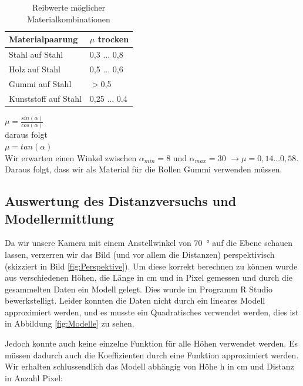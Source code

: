 \documentclass[a4paper]{report}
\begin{document}
\begin{table}[h!]
	\centering
	\begin{tabular}{|p{}|p{}|}
		\hline
		\textbf{Materialpaarung} & \textbf{$\mu$ trocken}\\
		\hline
		Stahl auf Stahl & 0,3 ... 0,8 \\
		\hline
		Holz auf Stahl & 0,5 ... 0,6\\
		\hline
		Gummi auf Stahl & $>$0,5 \\
		\hline
		Kunststoff auf Stahl & 0,25 ... 0.4\\
		\hline
	\end{tabular}
	\caption{Reibwerte möglicher Materialkombinationen \parencite{Wittel2015}}
	\label{tab:Reibwerte}
\end{table}

\noindent
$\mu=\frac{sin(\alpha)}{cos(\alpha)}$\\

\noindent
daraus folgt\\
$\mu=tan(\alpha)$\\
Wir erwarten einen Winkel zwischen $\alpha_{min}=8$ und $\alpha_{max}=30$ $ \rightarrow \mu = 0,14 ... 0,58$. Daraus folgt, dass wir als Material für die Rollen Gummi verwenden müssen.

\subsection{Auswertung des Distanzversuchs und Modellermittlung}
\label{ssec:DistModelCreation}

Da wir unsere Kamera mit einem Anstellwinkel von \SI{70}{\degree} auf die Ebene schauen lassen, verzerren wir das Bild (und vor allem die Distanzen) perspektivisch (skizziert in Bild \ref{fig:Perspektive}). Um diese korrekt berechnen zu können wurde aus verschiedenen Höhen, die Länge in cm und in Pixel gemessen und durch die gesammelten Daten ein Modell gelegt. Dies wurde im Programm R Studio bewerkstelligt. Leider konnten die Daten nicht durch ein lineares Modell approximiert werden, und es musste ein Quadratisches verwendet werden, dies ist in Abbildung \ref{fig:Modelle} zu sehen.

Jedoch konnte auch keine einzelne Funktion für alle Höhen verwendet werden. Es müssen dadurch auch die Koeffizienten durch eine Funktion approximiert werden. Wir erhalten schlussendlich das Modell abhängig von Höhe h in cm und Distanz in Anzahl Pixel:
\end{document}
